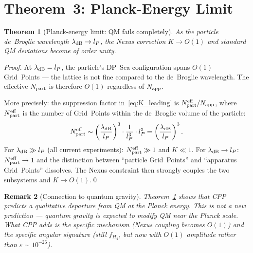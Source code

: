 \documentclass[11pt,letterpaper]{article}
\newtheorem{theorem}{Theorem}[section]
\newtheorem{remark}[theorem]{Remark}
\newcommand{\lP}{l_P}
\newcommand{\eps}{\varepsilon}
\newcommand{\Napp}{N_{\rm app}}
\newcommand{\Npart}{N_{\rm part}}
\begin{document}
\section{Theorem~3: Planck-Energy Limit}
\label{sec:planck}

\begin{theorem}[Planck-energy limit: QM fails completely]
\label{thm:planck}
As the particle de~Broglie wavelength $\lambda_{\rm dB} \to \lP$,
the Nexus correction $K \to O(1)$ and standard QM deviations
become of order unity.
\end{theorem}

\begin{proof}
At $\lambda_{\rm dB} = \lP$, the particle's DP~Sea configuration
spans $O(1)$ Grid~Points --- the lattice is not fine compared to the
de~Broglie wavelength.  The effective $\Npart$ is therefore $O(1)$
regardless of $\Napp$.

More precisely: the suppression factor in~\eqref{eq:K_leading} is
$\Npart^{\rm eff}/\Napp$, where $\Npart^{\rm eff}$ is the number of
Grid~Points within the de~Broglie volume of the particle:
\begin{equation}
\Npart^{\rm eff}
\sim \left(\frac{\lambda_{\rm dB}}{\lP}\right)^3 \cdot
     \frac{1}{\lP^3} \cdot \lP^3
= \left(\frac{\lambda_{\rm dB}}{\lP}\right)^3.
\label{eq:Npart_eff}
\end{equation}
For $\lambda_{\rm dB} \gg \lP$ (all current experiments):
$\Npart^{\rm eff} \gg 1$ and $K \ll 1$.
For $\lambda_{\rm dB} \to \lP$: $\Npart^{\rm eff} \to 1$ and
the distinction between ``particle Grid~Points'' and ``apparatus
Grid~Points'' dissolves.  The Nexus constraint then strongly
couples the two subsystems and $K \to O(1)$.\qed
\end{proof}

\begin{remark}[Connection to quantum gravity]
Theorem~\ref{thm:planck} shows that CPP predicts a qualitative
departure from QM at the Planck energy.  This is not a new
prediction --- quantum gravity is expected to modify QM near the
Planck scale.  What CPP adds is the \emph{specific mechanism}
(Nexus coupling becomes $O(1)$) and the \emph{specific angular
signature} (still $f_{H_4}$, but now with $O(1)$ amplitude rather
than $\eps \sim 10^{-26}$).
\end{remark}

\end{document}

